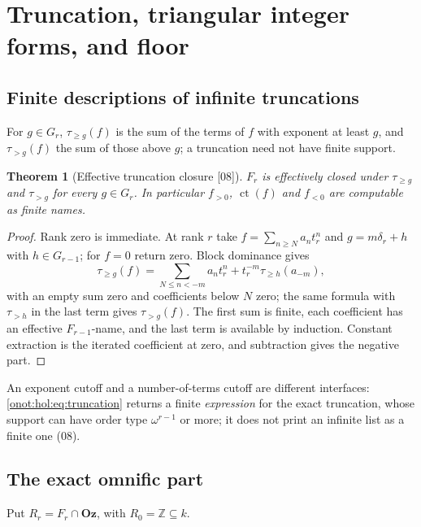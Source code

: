 \documentclass[11pt,oneside]{article}
\numberwithin{equation}{section}
\newtheorem{theorem}{Theorem}[section]
\theoremstyle{definition}
\theoremstyle{remark}
\newcommand{\Oz}{\mathbf{Oz}}
\newcommand{\Z}{\mathbb Z}
\newcommand{\ct}{\operatorname{ct}}
\newcommand{\tr}[1]{\tau_{\ge #1}}
\newcommand{\trs}[1]{\tau_{> #1}}
\newcommand{\src}[1]{\textup{\textsf{\small[#1]}}}
\begin{document}
\section{Truncation, triangular integer forms, and floor}\label{onot:hol:sec:integerpart}

\subsection{Finite descriptions of infinite truncations}

For $g\in G_r$, $\tr g(f)$ is the sum of the terms of $f$ with exponent at least
$g$, and $\trs g(f)$ the sum of those above $g$; a truncation need not have
finite support.

\begin{theorem}[Effective truncation closure \src{08}]\label{onot:hol:thm:truncation}
$F_r$ is effectively closed under $\tr g$ and $\trs g$ for every $g\in G_r$. In
particular $f_{>0}$, $\ct(f)$ and $f_{<0}$ are computable as finite names.
\end{theorem}
\begin{proof}
Rank zero is immediate. At rank $r$ take $f=\sum_{n\ge N}a_nt_r^n$ and
$g=m\delta_r+h$ with $h\in G_{r-1}$; for $f=0$ return zero. Block dominance gives
\begin{equation}\label{onot:hol:eq:truncation}
 \tr g(f)=\sum_{N\le n<-m}a_nt_r^n+t_r^{-m}\tr h(a_{-m}),
\end{equation}
with an empty sum zero and coefficients below $N$ zero; the same formula with
$\trs h$ in the last term gives $\trs g(f)$. The first sum is finite, each
coefficient has an effective $F_{r-1}$-name, and the last term is available by
induction. Constant extraction is the iterated coefficient at zero, and
subtraction gives the negative part.
\end{proof}

An exponent cutoff and a number-of-terms cutoff are different interfaces:
\eqref{onot:hol:eq:truncation} returns a finite \emph{expression} for the exact
truncation, whose support can have order type $\omega^{r-1}$ or more; it does not
print an infinite list as a finite one (08).

\subsection{The exact omnific part}

Put $R_r=F_r\cap\Oz$, with $R_0=\Z\subseteq k$.
\end{document}
